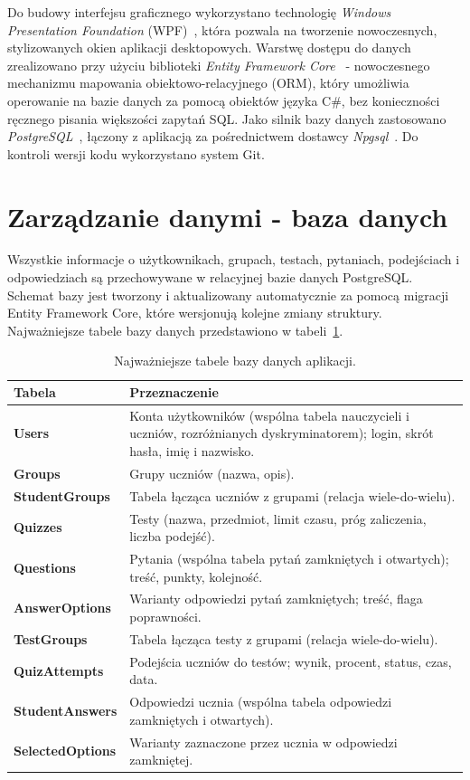 Do budowy interfejsu graficznego wykorzystano technologię \emph{Windows Presentation Foundation}
(WPF)~\cite{msdocsWPF}, która pozwala na tworzenie nowoczesnych, stylizowanych okien aplikacji
desktopowych. Warstwę dostępu do danych zrealizowano przy użyciu biblioteki \emph{Entity Framework
Core}~\cite{msdocsEFCore} - nowoczesnego mechanizmu mapowania obiektowo-relacyjnego (ORM), który
umożliwia operowanie na bazie danych za pomocą obiektów języka C\#, bez konieczności ręcznego
pisania większości zapytań SQL. Jako silnik bazy danych zastosowano
\emph{PostgreSQL}~\cite{postgresql}, łączony z aplikacją za pośrednictwem dostawcy
\emph{Npgsql}~\cite{npgsql}. Do kontroli wersji kodu wykorzystano system Git.

\section{Zarządzanie danymi - baza danych}
\label{sec:bazaDanych}

Wszystkie informacje o użytkownikach, grupach, testach, pytaniach, podejściach i odpowiedziach są
przechowywane w relacyjnej bazie danych PostgreSQL. Schemat bazy jest tworzony i aktualizowany
automatycznie za pomocą migracji Entity Framework Core, które wersjonują kolejne zmiany struktury.
Najważniejsze tabele bazy danych przedstawiono w tabeli~\ref{tab:tabele}.

\begin{table}[H]
  \centering
  \caption{Najważniejsze tabele bazy danych aplikacji.}
  \label{tab:tabele}
  \begin{tabularx}{\linewidth}{>{\bfseries}l X}
    \toprule
    Tabela & Przeznaczenie \\
    \midrule
    Users & Konta użytkowników (wspólna tabela nauczycieli i uczniów, rozróżnianych
            dyskryminatorem); login, skrót hasła, imię i nazwisko. \\
    Groups & Grupy uczniów (nazwa, opis). \\
    StudentGroups & Tabela łącząca uczniów z grupami (relacja wiele-do-wielu). \\
    Quizzes & Testy (nazwa, przedmiot, limit czasu, próg zaliczenia, liczba podejść). \\
    Questions & Pytania (wspólna tabela pytań zamkniętych i otwartych); treść, punkty, kolejność. \\
    AnswerOptions & Warianty odpowiedzi pytań zamkniętych; treść, flaga poprawności. \\
    TestGroups & Tabela łącząca testy z grupami (relacja wiele-do-wielu). \\
    QuizAttempts & Podejścia uczniów do testów; wynik, procent, status, czas, data. \\
    StudentAnswers & Odpowiedzi ucznia (wspólna tabela odpowiedzi zamkniętych i otwartych). \\
    SelectedOptions & Warianty zaznaczone przez ucznia w odpowiedzi zamkniętej. \\
    \bottomrule
  \end{tabularx}
\end{table}

